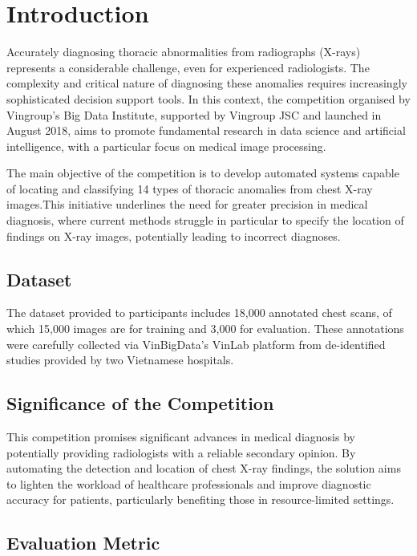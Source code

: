 \documentclass[12pt,oneside]{book} %
\begin{document}
\chapter{Introduction}

Accurately diagnosing thoracic abnormalities from radiographs (X-rays)
represents a considerable challenge, even for experienced radiologists. The
complexity and critical nature of diagnosing these anomalies requires
increasingly sophisticated decision support tools. In this context, the
competition organised by Vingroup's Big Data Institute, supported by Vingroup
JSC and launched in August 2018, aims to promote fundamental research in data
science and artificial intelligence, with a particular focus on medical image
processing.

The main objective of the competition is to develop automated systems capable
of locating and classifying 14 types of thoracic anomalies from chest X-ray
images.This initiative underlines the need for greater precision in medical
diagnosis, where current methods struggle in particular to specify the location
of findings on X-ray images, potentially leading to incorrect diagnoses.

\section{Dataset}

The dataset provided to participants includes 18,000 annotated chest scans, of
which 15,000 images are for training and 3,000 for evaluation. These
annotations were carefully collected via VinBigData's VinLab platform from
de-identified studies provided by two Vietnamese hospitals.

\section{Significance of the Competition}

This competition promises significant advances in medical diagnosis by
potentially providing radiologists with a reliable secondary opinion. By
automating the detection and location of chest X-ray findings, the solution
aims to lighten the workload of healthcare professionals and improve diagnostic
accuracy for patients, particularly benefiting those in resource-limited
settings.

\section{Evaluation Metric}
\end{document}
